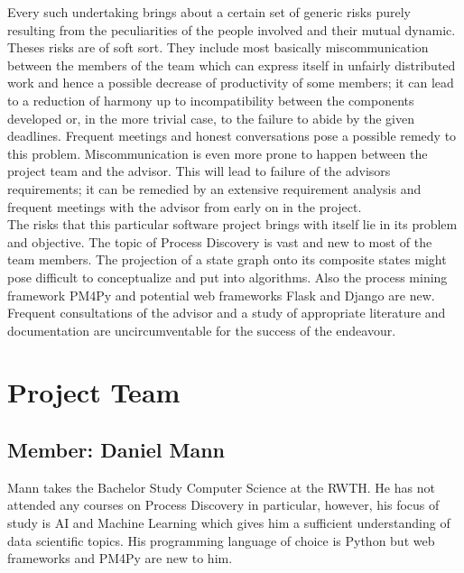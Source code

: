 \documentclass[12pt]{extarticle}
\begin{document}
Every such undertaking brings about a certain set of generic risks purely resulting from the peculiarities of the people involved and their mutual dynamic. Theses risks are of soft sort. They include most basically miscommunication between the members of the team which can express itself in unfairly distributed work and hence a possible decrease of productivity of some members; it can lead to a reduction of harmony up to incompatibility between the components developed or, in the more trivial case, to the failure to abide by the given deadlines. Frequent meetings and honest conversations pose a possible remedy to this problem. Miscommunication is even more prone to happen between the project team and the advisor. This will lead to failure of the advisors requirements; it can be remedied by an extensive requirement analysis and frequent meetings with the advisor from early on in the project.\\
The risks that this particular software project brings with itself lie in its problem and objective. The topic of Process Discovery is vast and new to most of the team members. The projection of a state graph onto its composite states might pose difficult to conceptualize and put into algorithms. Also the process mining framework PM4Py and potential web frameworks Flask and Django are new. Frequent consultations of the advisor and a study of appropriate literature and documentation are uncircumventable for the success of the endeavour.

\section{Project Team}

\subsection{Member: Daniel Mann}

Mann takes the Bachelor Study Computer Science at the RWTH. He has not attended any courses on Process Discovery in particular, however, his focus of study is AI and Machine Learning which gives him a sufficient understanding of data scientific topics. His programming language of choice is Python but web frameworks and PM4Py are new to him.

\printbibliography
\end{document}
